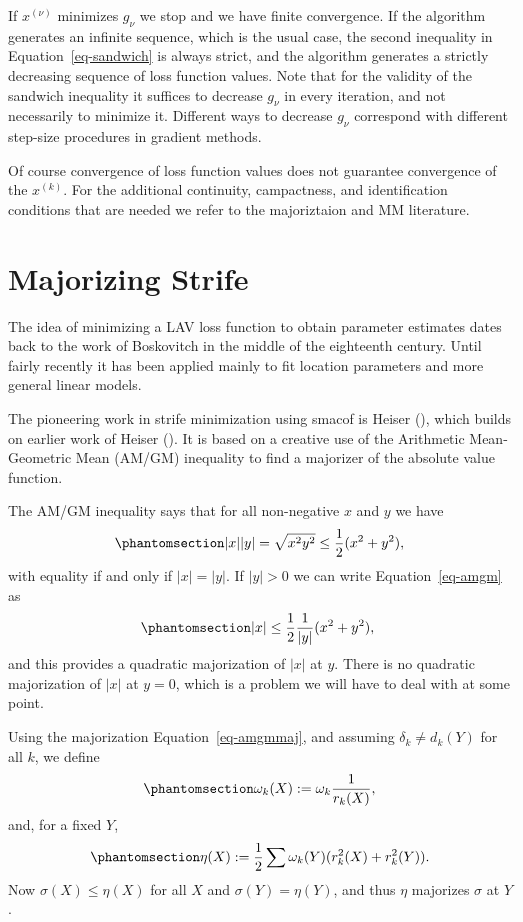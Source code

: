 \documentclass[
  12pt,
  letterpaper,
  DIV=11,
  numbers=noendperiod]{scrartcl}
\theoremstyle{definition}
\theoremstyle{definition}
\theoremstyle{plain}
\theoremstyle{plain}
\theoremstyle{plain}
\theoremstyle{remark}
\begin{document}
If \(x^{(\nu)}\) minimizes \(g_\nu\) we stop and we have finite
convergence. If the algorithm generates an infinite sequence, which is
the usual case, the second inequality in Equation~\ref{eq-sandwich} is
always strict, and the algorithm generates a strictly decreasing
sequence of loss function values. Note that for the validity of the
sandwich inequality it suffices to decrease \(g_\nu\) in every
iteration, and not necessarily to minimize it. Different ways to
decrease \(g_\nu\) correspond with different step-size procedures in
gradient methods.

Of course convergence of loss function values does not guarantee
convergence of the \(x^{(k)}\). For the additional continuity,
campactness, and identification conditions that are needed we refer to
the majoriztaion and MM literature.

\section{Majorizing Strife}\label{sec-majorization}

The idea of minimizing a LAV loss function to obtain parameter estimates
dates back to the work of Boskovitch in the middle of the eighteenth
century. Until fairly recently it has been applied mainly to fit
location parameters and more general linear models.

The pioneering work in strife minimization using smacof is Heiser
(), which builds on earlier work of Heiser
(). It is based on a creative use of the
Arithmetic Mean-Geometric Mean (AM/GM) inequality to find a majorizer of
the absolute value function.

The AM/GM inequality says that for all non-negative \(x\) and \(y\) we
have \begin{equation}\phantomsection\label{eq-amgm}{
|x||y|=\sqrt{x^2y^2}\leq\frac12(x^2+y^2),
}\end{equation} with equality if and only if \(|x|=|y|\). If \(|y|>0\)
we can write Equation~\ref{eq-amgm} as
\begin{equation}\phantomsection\label{eq-amgmmaj}{
|x|\leq\frac12\frac{1}{|y|}(x^2+y^2),\
}\end{equation} and this provides a quadratic majorization of \(|x|\) at
\(y\). There is no quadratic majorization of \(|x|\) at \(y=0\), which
is a problem we will have to deal with at some point.

Using the majorization Equation~\ref{eq-amgmmaj}, and assuming
\(\delta_k\not=d_k(Y)\) for all \(k\), we define
\begin{equation}\phantomsection\label{eq-wk1def}{
\omega_k(X):=\omega_k\frac{1}{r_k(X)},
}\end{equation} and, for a fixed \(Y\),
\begin{equation}\phantomsection\label{eq-strifemaj}{
\eta(X):=\frac12\sum \omega_k(Y)(r_k^2(X)+r_k^2(Y)).
}\end{equation} Now \(\sigma(X)\leq\eta(X)\) for all \(X\) and
\(\sigma(Y)=\eta(Y)\), and thus \(\eta\) majorizes \(\sigma\) at \(Y\).
\end{document}
